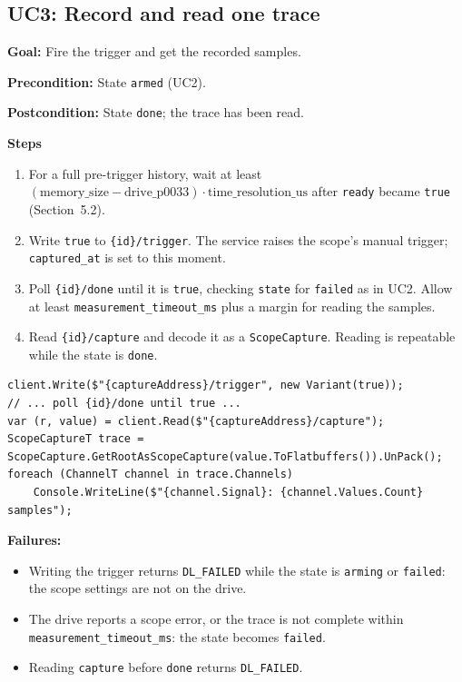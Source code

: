 \documentclass[11pt,a4paper]{article}
\newcommand{\dl}[1]{\texttt{#1}}
\newcommand{\res}[1]{\texttt{#1}}
\newenvironment{usecase}[1]
  {\subsection{#1}}
  {}
\newcommand{\ucfield}[2]{\par\noindent\textbf{#1:} #2\par}
\begin{document}
\begin{usecase}{UC3: Record and read one trace}
\ucfield{Goal}{Fire the trigger and get the recorded samples.}
\ucfield{Precondition}{State \dl{armed} (UC2).}
\ucfield{Postcondition}{State \dl{done}; the trace has been read.}

\textbf{Steps}
\begin{enumerate}[nosep]
  \item For a full pre-trigger history, wait at least
        $(\text{memory\_size} - \text{drive\_p0033}) \cdot \text{time\_resolution\_us}$
        after \dl{ready} became \dl{true} (Section~5.2).
  \item Write \dl{true} to \dl{\{id\}/trigger}. The service raises the scope's
        manual trigger; \dl{captured\_at} is set to this moment.
  \item Poll \dl{\{id\}/done} until it is \dl{true}, checking \dl{state} for
        \dl{failed} as in UC2. Allow at least \dl{measurement\_timeout\_ms}
        plus a margin for reading the samples.
  \item Read \dl{\{id\}/capture} and decode it as a \dl{ScopeCapture}.
        Reading is repeatable while the state is \dl{done}.
\end{enumerate}

\begin{lstlisting}[language={[Sharp]C}]
client.Write($"{captureAddress}/trigger", new Variant(true));
// ... poll {id}/done until true ...
var (r, value) = client.Read($"{captureAddress}/capture");
ScopeCaptureT trace = ScopeCapture.GetRootAsScopeCapture(value.ToFlatbuffers()).UnPack();
foreach (ChannelT channel in trace.Channels)
    Console.WriteLine($"{channel.Signal}: {channel.Values.Count} samples");
\end{lstlisting}

\textbf{Failures:}
\begin{itemize}[nosep]
  \item Writing the trigger returns \res{DL\_FAILED} while the state is
        \dl{arming} or \dl{failed}: the scope settings are not on the drive.
  \item The drive reports a scope error, or the trace is not complete within
        \dl{measurement\_timeout\_ms}: the state becomes \dl{failed}.
  \item Reading \dl{capture} before \dl{done} returns \res{DL\_FAILED}.
\end{itemize}
\end{usecase}
\end{document}
